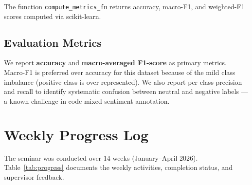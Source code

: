 \documentclass[12pt,a4paper]{report}
\begin{document}
The function \texttt{compute\_metrics\_fn} returns accuracy, macro-F1, and weighted-F1 scores computed via scikit-learn.

\section{Evaluation Metrics}

We report \textbf{accuracy} and \textbf{macro-averaged F1-score} as primary metrics. Macro-F1 is preferred over accuracy for this dataset because of the mild class imbalance (positive class is over-represented). We also report per-class precision and recall to identify systematic confusion between neutral and negative labels — a known challenge in code-mixed sentiment annotation.

\chapter{Weekly Progress Log}

The seminar was conducted over 14 weeks (January--April 2026). Table~\ref{tab:progress} documents the weekly activities, completion status, and supervisor feedback.
\end{document}
